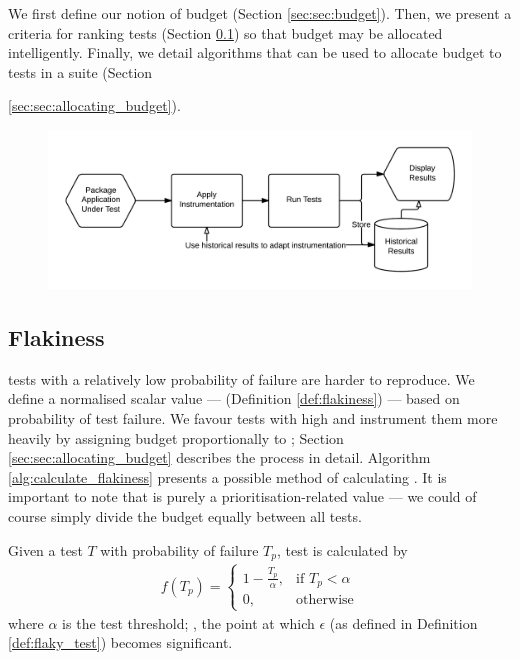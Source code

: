 We first define our notion of budget (Section \ref{sec:sec:budget}). Then, we
present a criteria for ranking \flaky tests (Section \ref{sec:sec:flakiness}) so
that budget may be allocated intelligently. Finally, we detail algorithms that
can be used to allocate budget to tests in a suite (Section
{\ref{sec:sec:allocating_budget}).

\begin{figure}[h]

\includegraphics[width=\linewidth]{Images/architecture_overview}

\caption{}
\label{fig:architecture_overview}
\end{figure}


\subsection{Flakiness}
\label{sec:sec:flakiness}

\Flaky tests with a relatively low probability of failure are harder to
reproduce. We define a normalised scalar value --- \emph{\flakiness} (Definition
\ref{def:flakiness}) --- based on probability of test failure. We favour tests
with high \flakiness and instrument them more heavily by assigning \flaky budget
proportionally to \flakiness; Section \ref{sec:sec:allocating_budget} describes
the process in detail. Algorithm \ref{alg:calculate_flakiness} presents a
possible method of calculating \flakiness. It is important to note that
\flakiness is purely a prioritisation-related value --- we could of course
simply divide the \flaky budget equally between all \flaky tests.

\begin{defn}[\Flakiness]
\label{def:flakiness}

Given a test $T$ with probability of failure $T_{p}$, test \flakiness is
calculated by
\begin{align*}
  f(T_{p})=
	\begin{cases}
	    1 - \frac{T_{p}}{\alpha},& \text{if } T_{p}< \alpha\\
	    0,              & \text{otherwise}
	\end{cases}
\end{align*}
where $\alpha$ is the \flaky test threshold; \ie, the point at which $\epsilon$
(as defined in Definition \ref{def:flaky_test}) becomes significant.


\end{defn}}
